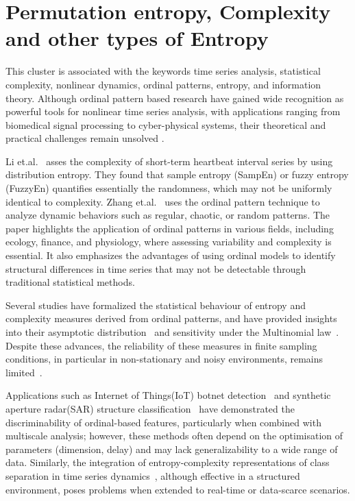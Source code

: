 \section{Permutation entropy, Complexity and other types of Entropy}\label{Sec:ReviewTopicPE}
This cluster is associated with the keywords time series analysis, statistical complexity, nonlinear dynamics, ordinal patterns, entropy, and information theory. Although ordinal pattern based research have gained wide recognition as powerful tools for nonlinear time series analysis, with applications ranging from biomedical signal processing to cyber-physical systems, their theoretical and practical challenges remain unsolved \cite{Keller2017, Zanin2012}. 

Li et.al.~\cite{Li2015e} asses the complexity of short-term heartbeat interval series by using distribution entropy. They found that sample entropy (SampEn) or fuzzy entropy (FuzzyEn) quantifies essentially the randomness, which may not be uniformly identical to complexity. Zhang et.al.~\cite{Zhang2018d} uses the ordinal pattern technique to analyze dynamic behaviors such as regular, chaotic, or random patterns. The paper highlights the application of ordinal patterns in various fields, including ecology, finance, and physiology, where assessing variability and complexity is essential. It also emphasizes the advantages of using ordinal models to identify structural differences in time series that may not be detectable through traditional statistical methods.

Several studies have formalized the statistical behaviour of entropy and complexity measures derived from ordinal patterns, and have provided insights into their asymptotic distribution~\cite{Rey2024, Rey2023a} and sensitivity under the Multinomial law~\cite{Rey2023}. Despite these advances, the reliability of these measures in finite sampling conditions, in particular in non-stationary and noisy environments, remains limited~\cite{Borges2023}. 

Applications such as  Internet of Things(IoT) botnet detection~\cite{Borges2023} and  synthetic aperture radar(SAR) structure classification~\cite{Chagas2021a} have demonstrated the discriminability of ordinal-based features, particularly when combined with multiscale analysis; however, these methods often depend on the optimisation of parameters (dimension, delay) and may lack generalizability to a wide range of data. Similarly, the integration of entropy-complexity representations of class separation in time series dynamics~\cite{Borges2022}, although effective in a structured environment, poses problems when extended to real-time or data-scarce scenarios. 

